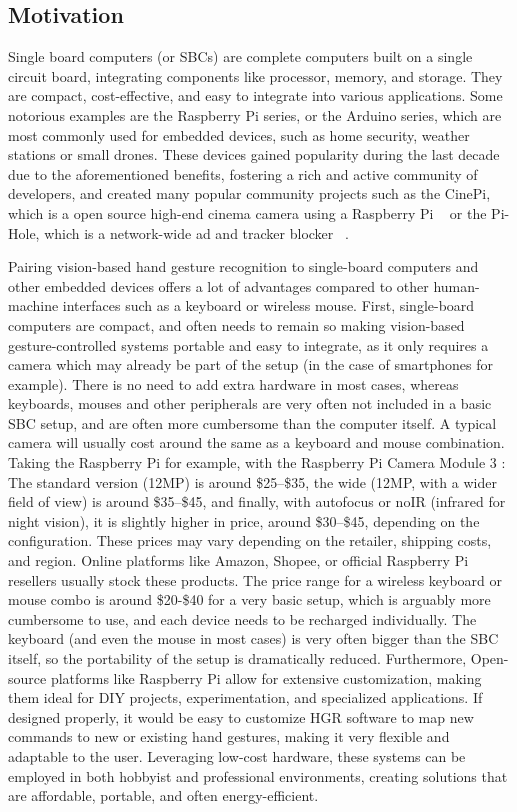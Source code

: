 \documentclass[12pt]{article}
\begin{document}
\subsection{Motivation}

Single board computers (or SBCs) are complete computers built on a single circuit board, integrating components like processor, memory, and storage. They are compact, cost-effective, and easy to integrate into various applications. Some notorious examples are the Raspberry Pi series, or the Arduino series, which are most commonly used for embedded devices, such as home security, weather stations or small drones.
These devices gained popularity during the last decade due to the aforementioned benefits, fostering a rich and active community of developers, and created many popular community projects such as the CinePi, which is a open source high-end cinema camera using a Raspberry Pi ~\cite{CINEPI} or the Pi-Hole, which is a network-wide ad and tracker blocker ~\cite{PIHOLE}.

Pairing vision-based hand gesture recognition to single-board computers and other embedded devices offers a lot of advantages compared to other human-machine interfaces such as a keyboard or wireless mouse.
First, single-board computers are compact, and often needs to remain so making vision-based gesture-controlled systems portable and easy to integrate, as it only requires a camera which may already be part of the setup (in the case of smartphones for example). There is no need to add extra hardware in most cases, whereas keyboards, mouses and other peripherals are very often not included in a basic SBC setup, and are often more cumbersome than the computer itself.
A typical camera will usually cost around the same as a keyboard and mouse combination. Taking the Raspberry Pi for example, with the Raspberry Pi Camera Module 3 : The standard version (12MP) is around \$25–\$35, the wide (12MP, with a wider field of view) is around \$35–\$45, and finally, with autofocus or noIR (infrared for night vision), it is slightly higher in price, around \$30–\$45, depending on the configuration. These prices may vary depending on the retailer, shipping costs, and region. Online platforms like Amazon, Shopee, or official Raspberry Pi resellers usually stock these products.
The price range for a wireless keyboard or mouse combo is around \$20-\$40 for a very basic setup, which is arguably more cumbersome to use, and each device needs to be recharged individually. The keyboard (and even the mouse in most cases) is very often bigger than the SBC itself, so the portability of the setup is dramatically reduced.
Furthermore, Open-source platforms like Raspberry Pi allow for extensive customization, making them ideal for DIY projects, experimentation, and specialized applications. If designed properly, it would be easy to customize HGR software to map new commands to new or existing hand gestures, making it very flexible and adaptable to the user. Leveraging low-cost hardware, these systems can be employed in both hobbyist and professional environments, creating solutions that are affordable, portable, and often energy-efficient.
\end{document}
